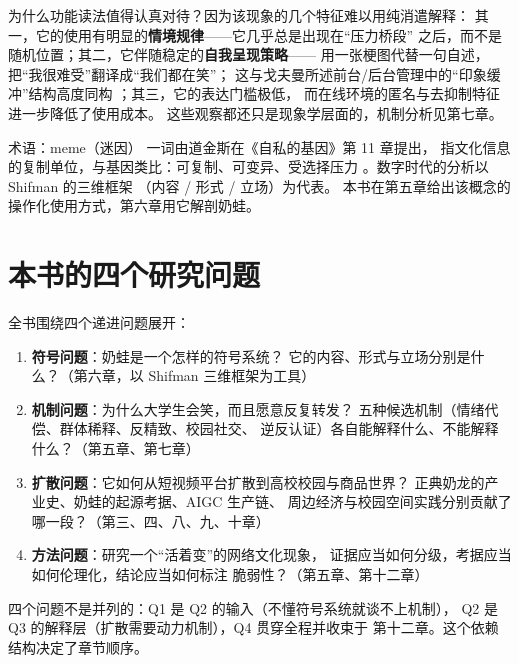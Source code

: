 为什么功能读法值得认真对待？因为该现象的几个特征难以用纯消遣解释：
其一，它的使用有明显的\textbf{情境规律}——它几乎总是出现在“压力桥段”
之后，而不是随机位置；其二，它伴随稳定的\textbf{自我呈现策略}——
用一张梗图代替一句自述，把“我很难受”翻译成“我们都在笑”；
这与戈夫曼所述前台/后台管理中的“印象缓冲”结构高度同构
\cite{goffman1959presentation}；其三，它的表达门槛极低，
而在线环境的匿名与去抑制特征进一步降低了使用成本\cite{suler2004disinhibition}。
这些观察都还只是现象学层面的，机制分析见第七章。

\begin{nltermbox}{术语：meme（迷因）}
   一词由道金斯在《自私的基因》第 11 章提出，
  指文化信息的复制单位，与基因类比：可复制、可变异、受选择压力
  \cite{dawkins1976selfish}。数字时代的分析以 Shifman 的三维框架
  （内容 / 形式 / 立场）为代表\cite{shifman2013memes}。
  本书在第五章给出该概念的操作化使用方式，第六章用它解剖奶蛙。
\end{nltermbox}

\section{本书的四个研究问题}\label{sec:01:questions}

全书围绕四个递进问题展开：

\begin{enumerate}[label=\textbf{Q\arabic*},leftmargin=4em,itemsep=0.4em]
  \item \textbf{符号问题}：奶蛙是一个怎样的符号系统？
        它的内容、形式与立场分别是什么？（第六章，以 Shifman
        三维框架\cite{shifman2013memes}为工具）
  \item \textbf{机制问题}：为什么大学生会笑，而且愿意反复转发？
        五种候选机制（情绪代偿、群体稀释、反精致、校园社交、
        逆反认证）各自能解释什么、不能解释什么？（第五章、第七章）
  \item \textbf{扩散问题}：它如何从短视频平台扩散到高校校园与商品世界？
        正典奶龙的产业史、奶蛙的起源考据、AIGC 生产链、
        周边经济与校园空间实践分别贡献了哪一段？（第三、四、八、九、十章）
  \item \textbf{方法问题}：研究一个“活着变”的网络文化现象，
        证据应当如何分级，考据应当如何伦理化，结论应当如何标注
        脆弱性？（第五章、第十二章）
\end{enumerate}

四个问题不是并列的：Q1 是 Q2 的输入（不懂符号系统就谈不上机制），
Q2 是 Q3 的解释层（扩散需要动力机制），Q4 贯穿全程并收束于
第十二章。这个依赖结构决定了章节顺序。

